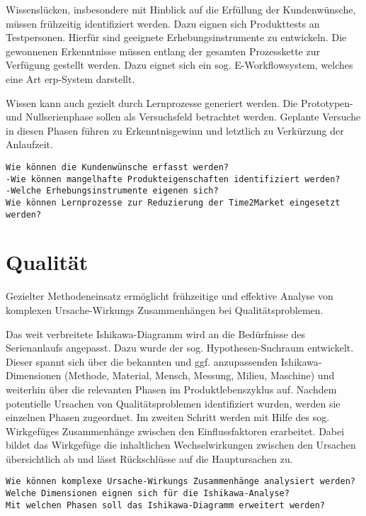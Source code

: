 Wissenslücken, insbesondere mit Hinblick auf die Erfüllung der Kundenwünsche, müssen frühzeitig identifiziert werden. Dazu eignen sich Produkttests an Testpersonen. Hierfür sind geeignete Erhebungsinstrumente zu entwickeln. Die gewonnenen Erkenntnisse müssen entlang der gesamten Prozesskette zur Verfügung gestellt werden. Dazu eignet sich ein sog. E-Workflowsystem, welches eine Art \gls{erp}-System darstellt. 

Wissen kann auch gezielt durch Lernprozesse generiert werden. Die Prototypen- und Nullserienphase sollen als Versuchsfeld betrachtet werden. Geplante Versuche in diesen Phasen führen zu Erkenntnisgewinn und letztlich zu Verkürzung der Anlaufzeit. 

\begin{verbatim}
Wie können die Kundenwünsche erfasst werden? 
-Wie können mangelhafte Produkteigenschaften identifiziert werden? 
-Welche Erhebungsinstrumente eigenen sich?
Wie können Lernprozesse zur Reduzierung der Time2Market eingesetzt werden? 
\end{verbatim}

\section{Qualität}

Gezielter Methodeneinsatz ermöglicht frühzeitige und effektive Analyse von komplexen Ursache-Wirkungs %
Zusammenhängen bei Qualitätsproblemen. 

Das weit verbreitete Ishikawa-Diagramm wird an die Bedürfnisse des Serienanlaufs angepasst. Dazu wurde der sog. Hypothesen-Suchraum entwickelt. Dieser spannt sich über die bekannten und ggf. anzupassenden Ishikawa-Dimensionen (Methode, Material, Mensch, Messung, Milieu, Maschine) und weiterhin über die relevanten Phasen im Produktlebenszyklus auf. Nachdem potentielle Ursachen  von Qualitätsproblemen identifiziert wurden, werden sie einzelnen Phasen zugeordnet. Im zweiten Schritt werden mit Hilfe des sog. Wirkgefüges Zusammenhänge zwischen den Einflussfaktoren erarbeitet. Dabei bildet das Wirkgefüge die inhaltlichen Wechselwirkungen zwischen den Ursachen übersichtlich ab und lässt Rückschlüsse auf die Hauptursachen zu.

\begin{verbatim}
Wie können komplexe Ursache-Wirkungs Zusammenhänge analysiert werden? 
Welche Dimensionen eignen sich für die Ishikawa-Analyse? 
Mit welchen Phasen soll das Ishikawa-Diagramm erweitert werden?
\end{verbatim}


